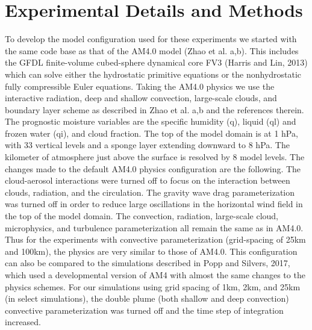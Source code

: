 \documentclass[11pt]{article}   	%
\begin{document}
\section{Experimental Details and Methods}

To develop the model configuration used for these experiments we started with the same code base as that of the AM4.0 
model (Zhao et al. a,b).  This includes the GFDL finite-volume cubed-sphere dynamical core FV3 (Harris and Lin, 2013) 
which can solve either the hydrostatic primitive equations or the nonhydrostatic fully compressible Euler equations.  Taking 
the AM4.0 physics we use the interactive radiation, deep and shallow convection, large-scale clouds, and boundary layer 
scheme as described in Zhao et al. a,b and the references therein.  The prognostic moisture variables are the specific 
humidity (q), liquid (ql) and frozen water (qi), and cloud fraction.  The top of the model domain is at 1 hPa, with 33 vertical 
levels and a sponge layer extending downward to 8 hPa.  The kilometer of atmosphere just above the surface is resolved by 
8 model levels.  The changes made to the default AM4.0 physics configuration are the following.  The cloud-aerosol 
interactions were turned off to focus on the interaction between clouds, radiation, and the circulation.  The gravity wave drag 
parameterization was turned off 
in order to reduce large oscillations in the horizontal wind field in the top of the model domain.  The convection, radiation, 
large-scale cloud, microphysics, and turbulence parameterization all remain the same as in AM4.0.  
Thus for the experiments with convective parameterization (grid-spacing of 25km and 100km), the physics are very 
similar to those of AM4.0.  This configuration can also be compared to the simulations described in 
Popp and Silvers, 2017, which used a developmental version of AM4 with almost the same changes to the physics
schemes.
For our simulations using grid spacing of 1km, 2km, and 25km (in select simulations), the double plume (both shallow and deep convection) convective parameterization was 
turned off and the time step of integration increased.   
\end{document}
